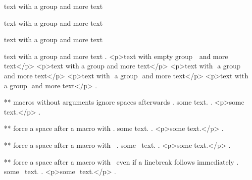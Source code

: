 text with {a group} and more text

text with { a group } and more text

text with { a group  } and more text

text with {  a group  }  and more text
.
<p>text with empty group ​ ​ and more text</p>
<p>text with a group​ and more text</p>
<p>text with ​ a group ​ and more text</p>
<p>text with ​ a group ​ and more text</p>
<p>text with ​ a group ​ and more text</p>
.


** macros without arguments ignore spaces afterwards
.
some \echo  text.
.
<p>some text.</p>
.


** force a space after a macro with {}
.
some \echo{} text.
.
<p>some ​ text.</p>
.


** force a space after a macro with \
.
some \echo\ text.
.
<p>some ​ text.</p>
.


** force a space after a macro with \ even if a linebreak follows immediately
.
some \echo\
text.
.
<p>some ​ text.</p>
.
